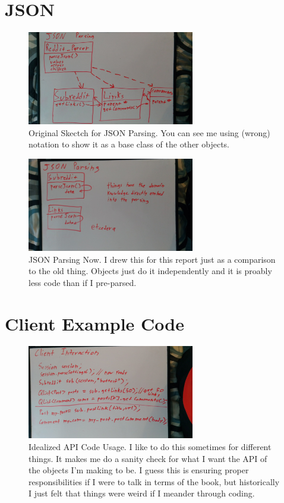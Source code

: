 \documentclass[12pt]{article}
\begin{document}
\section{JSON}
\begin{figure}[ht]
	\centering
	\caption{Original Skectch for JSON Parsing. You can see me using (wrong) notation to show it as a base class of the other objects.}
	\label{json1}
	\includegraphics[width=0.65\textwidth]{json1.jpg}
	\vspace{-10pt}
\end{figure}
\begin{figure}[ht]
	\centering
	\caption{JSON Parsing Now. I drew this for this report just as a comparison to the old thing. Objects just do it independently and it is proably less code than if I pre-parsed.}
	\label{json2}
	\includegraphics[width=0.65\textwidth]{json2.jpg}
	\vspace{-10pt}
\end{figure}

\clearpage
\section{Client Example Code}
\begin{figure}[ht]
	\centering
	\caption{Idealized API Code Usage. I like to do this sometimes for different things. It makes me do a sanity check for what I want the API of the objects I'm making to be. I guess this is ensuring proper responsibilities if I were to talk in terms of the book, but historically I just felt that things were weird if I meander through coding.}
	\label{json1}
	\includegraphics[width=0.65\textwidth]{client_example_code.jpg}
	\vspace{-10pt}
\end{figure}
\end{document}
